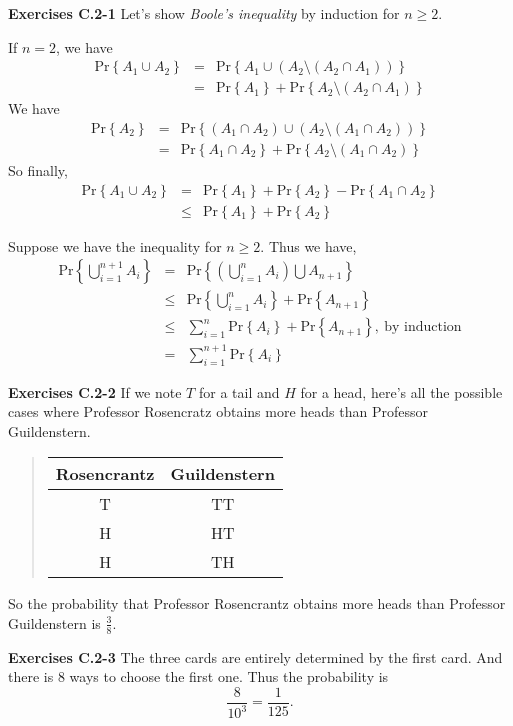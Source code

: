 \documentclass[a4paper,12pt]{article}
\newcommand{\newpar}[1]
{\bigskip \noindent \textbf{Exercises #1} \newline}
\newcommand{\prob}[1]{\mathrm{Pr}\left\{ #1 \right\}}
\begin{document}
\newpar{C.2-1}
Let's show \emph{Boole's inequality} by induction for $n \ge 2$.

If $n = 2$, we have
\begin{eqnarray*}
  \prob{A_1 \cup A_2} &=&
  \prob{A_1 \cup (A_2 \setminus (A_2 \cap A_1))} \\ &=&
  \prob{A_1} + \prob{A_2 \setminus (A_2 \cap A_1)}
\end{eqnarray*}
We have
\begin{eqnarray*}
  \prob{A_2} &=& \prob{(A_1 \cap A_2) \cup (A_2\setminus (A_1 \cap
    A_2))} \\ &=&
  \prob{A_1 \cap A_2} + \prob{A_2 \setminus (A_1 \cap A_2)}
\end{eqnarray*}
So finally,
\begin{eqnarray*}
  \prob{A_1 \cup A_2} &=& \prob{A_1} + \prob{A_2} - \prob{A_1 \cap
    A_2} \\ &\le&
  \prob{A_1} + \prob{A_2}
\end{eqnarray*}


Suppose we have the inequality for $n \ge 2$.  Thus we have,
\begin{eqnarray*}
  \prob{\bigcup_{i=1}^{n+1}A_i} &=&
  \prob{\left(\bigcup_{i=1}^nA_i\right) \bigcup A_{n+1}} \\
  &\le& \prob{\bigcup_{i=1}^nA_i} + \prob{A_{n+1}} \\
  &\le& \sum_{i=1}^n \prob{A_i} + \prob{A_{n+1}},\ \mbox{by
    induction}\\ &=&
  \sum_{i=1}^{n+1}\prob{A_i}
\end{eqnarray*}

\newpar{C.2-2}
If we note $T$ for a tail and $H$ for a head, here's all the
possible cases where Professor Rosencratz obtains more heads than
Professor Guildenstern.
\begin{quote}
  \begin{tabular}{|c|c|}
      \hline
      Rosencrantz & Guildenstern \\
      \hline
      T & TT \\
      \hline
      H & HT \\
      \hline
      H & TH \\
      \hline
  \end{tabular}
\end{quote}
So the probability that Professor Rosencrantz obtains more heads than
Professor Guildenstern is $\frac{3}{8}$.

\newpar{C.2-3}
The three cards are entirely determined by the first card.  And there
is $8$ ways to choose the first one.  Thus the probability is
\[ \frac{8}{10^3} = \frac{1}{125}.\]
\end{document}
